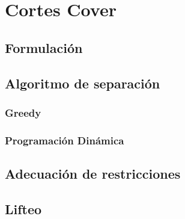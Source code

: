 \section{Cortes Cover}


\subsection{Formulaci\'on}








\bigskip
\subsection{Algoritmo de separaci\'on}


\bigskip
\subsubsection{Greedy}

\medskip
\subsubsection{Programaci\'on Din\'amica}

\medskip
\subsection{Adecuaci\'on de restricciones}

\bigskip
\subsection{Lifteo}